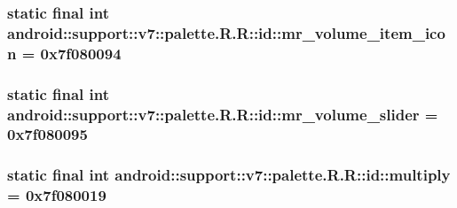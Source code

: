 \hypertarget{classandroid_1_1support_1_1v7_1_1palette_1_1_r_1_1id_0eaa9c12426491d3fd4db9545a2c8b24}{
\subsubsection[{mr\_\-volume\_\-item\_\-icon}]{\setlength{\rightskip}{0pt plus 5cm}static final int android::support::v7::palette.R.R::id::mr\_\-volume\_\-item\_\-icon = 0x7f080094}}
\label{classandroid_1_1support_1_1v7_1_1palette_1_1_r_1_1id_0eaa9c12426491d3fd4db9545a2c8b24}


\hypertarget{classandroid_1_1support_1_1v7_1_1palette_1_1_r_1_1id_007671d444d4d79134ec3b85130265bf}{
\subsubsection[{mr\_\-volume\_\-slider}]{\setlength{\rightskip}{0pt plus 5cm}static final int android::support::v7::palette.R.R::id::mr\_\-volume\_\-slider = 0x7f080095}}
\label{classandroid_1_1support_1_1v7_1_1palette_1_1_r_1_1id_007671d444d4d79134ec3b85130265bf}


\hypertarget{classandroid_1_1support_1_1v7_1_1palette_1_1_r_1_1id_3b0a826f3fa1774f83a2505f633686aa}{
\subsubsection[{multiply}]{\setlength{\rightskip}{0pt plus 5cm}static final int android::support::v7::palette.R.R::id::multiply = 0x7f080019}}
\label{classandroid_1_1support_1_1v7_1_1palette_1_1_r_1_1id_3b0a826f3fa1774f83a2505f633686aa}


